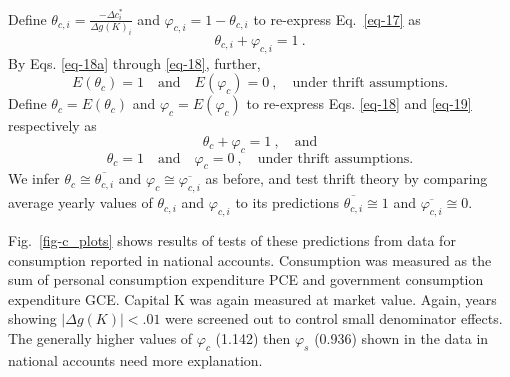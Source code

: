 \documentclass[a4paper,fleqn]{latex_styles/cas-sc}
\begin{document}
%
Define \(\theta_{c,i} = \frac{- \Delta c^{*}_{i}}{ \Delta g(K)_{i}}\)
and \(\varphi_{c,i} = 1 - \theta_{c,i}\) to
re-express Eq.~\eqref{eq-17} as
%
\begin{equation}
\theta_{c,i} + \varphi_{c,i} = 1\ .\label{eq-18}
\end{equation}
%
By Eqs. \eqref{eq-18a} through \eqref{eq-18}, further,
%
\begin{equation}
    E\left( \theta_{c} \right) = 1 \quad \text{and} \quad E\left( \varphi_{c} \right) = 0 \ , \quad \text{under thrift assumptions.}\label{eq-19}
\end{equation}
%
Define \(\theta_{c} = E\left( \theta_{c} \right)\) and
\(\varphi_{c} = E\left( \varphi_{c} \right)\) to re-express
Eqs. \eqref{eq-18} and \eqref{eq-19} respectively as
\begin{equation}
    \theta_c + \varphi_c = 1 \ , \quad \text{and}
    \label{eq-20}
\end{equation}
\vspace{-5ex}
\begin{equation}
    \theta_c = 1 \quad \text{and} \quad \varphi_c = 0 \ , \quad \text{under thrift assumptions.}
    \label{eq-21}
\end{equation}
We infer \(\theta_c \cong \overline{\theta_{c,i}}\) and \(\varphi_c \cong \overline{\varphi_{c,i}}\) as before, and test thrift theory by comparing average yearly values of $\theta_{c,i}$ and $\varphi_{c,i}$ to its predictions $\overline{\theta_{c,i}} \cong 1$ and $\overline{\varphi_{c,i}} \cong 0$.

Fig.~\ref{fig-c_plots} shows results of tests of these predictions from
data for consumption reported in national accounts. Consumption was
measured as the sum of personal consumption expenditure PCE and
government consumption expenditure GCE. Capital K was again measured at
market value. Again, years showing \(|\Delta g(K)| < .01\) were screened
out to control small denominator effects. 
The generally higher values of \(\varphi_c\) (1.142) then \(\varphi_s\) (0.936) shown in the data in national accounts need more explanation.  

\FloatBarrier

\FloatBarrier
\end{document}
